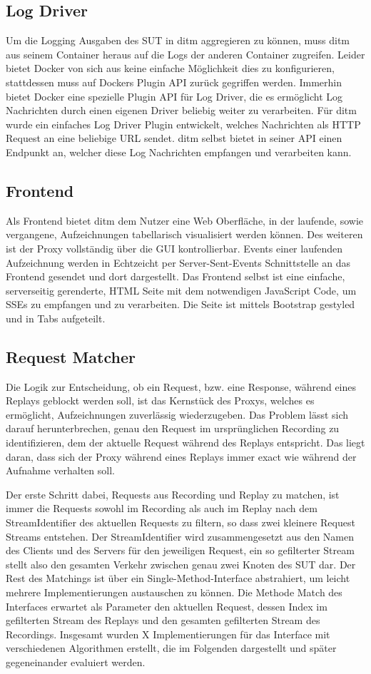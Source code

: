 \documentclass[a4paper]{report}
\begin{document}
\subsection{Log Driver}
Um die Logging Ausgaben des SUT in ditm aggregieren zu können, muss ditm aus seinem Container heraus auf die Logs der
anderen Container zugreifen. Leider bietet Docker von sich aus keine einfache Möglichkeit dies zu konfigurieren,
stattdessen muss auf Dockers Plugin API zurück gegriffen werden. Immerhin bietet Docker eine spezielle Plugin API
für Log Driver, die es ermöglicht Log Nachrichten durch einen eigenen Driver beliebig weiter zu verarbeiten.
Für ditm wurde ein einfaches Log Driver Plugin entwickelt, welches Nachrichten als HTTP Request an eine beliebige URL
sendet. ditm selbst bietet in seiner API einen Endpunkt an, welcher diese Log Nachrichten empfangen und verarbeiten kann.
\subsection{Frontend}
Als Frontend bietet ditm dem Nutzer eine Web Oberfläche, in der laufende, sowie vergangene, Aufzeichnungen
tabellarisch visualisiert werden können. Des weiteren ist der Proxy vollständig über die GUI kontrollierbar.
Events einer laufenden Aufzeichnung werden in Echtzeicht per Server-Sent-Events Schnittstelle an das Frontend
gesendet und dort dargestellt.
Das Frontend selbst ist eine einfache, serverseitig gerenderte, HTML Seite mit dem notwendigen JavaScript Code,
um SSEs zu empfangen und zu verarbeiten. Die Seite ist mittels Bootstrap gestyled und in Tabs aufgeteilt.
\subsection{Request Matcher}
Die Logik zur Entscheidung, ob ein Request, bzw. eine Response, während eines Replays geblockt werden soll,
ist das Kernstück des Proxys, welches es ermöglicht, Aufzeichnungen zuverlässig wiederzugeben.
Das Problem lässt sich darauf herunterbrechen, genau den Request im ursprünglichen Recording zu identifizieren,
dem der aktuelle Request während des Replays entspricht. Das liegt daran, dass sich der Proxy während eines
Replays immer exact wie während der Aufnahme verhalten soll.

Der erste Schritt dabei, Requests aus Recording und Replay zu matchen, ist immer die Requests sowohl im
Recording als auch im Replay nach dem StreamIdentifier des aktuellen Requests zu filtern, so dass zwei
kleinere Request Streams entstehen. Der StreamIdentifier wird zusammengesetzt aus den Namen des Clients
und des Servers für den jeweiligen Request, ein so gefilterter Stream stellt also den gesamten Verkehr
zwischen genau zwei Knoten des SUT dar. 
Der Rest des Matchings ist über ein Single-Method-Interface abstrahiert, um leicht mehrere Implementierungen
austauschen zu können. Die Methode Match des Interfaces erwartet als Parameter den aktuellen Request,
dessen Index im gefilterten Stream des Replays und den gesamten gefilterten Stream des Recordings.
Insgesamt wurden X Implementierungen für das Interface mit verschiedenen Algorithmen erstellt, die im Folgenden
dargestellt und später gegeneinander evaluiert werden.
\end{document}
